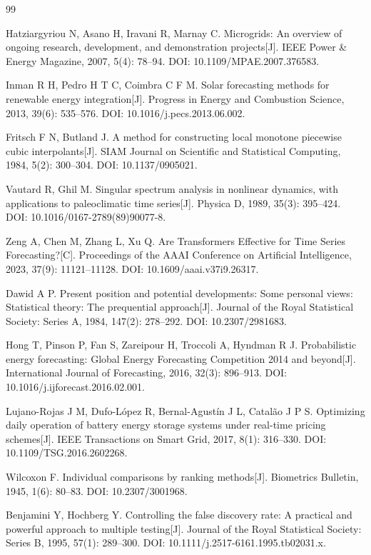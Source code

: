\begin{thebibliography}{99}

Hatziargyriou N, Asano H, Iravani R, Marnay C.
Microgrids: An overview of ongoing research, development, and demonstration projects[J].
IEEE Power \& Energy Magazine, 2007, 5(4): 78--94.
DOI: 10.1109/MPAE.2007.376583.

Inman R H, Pedro H T C, Coimbra C F M.
Solar forecasting methods for renewable energy integration[J].
Progress in Energy and Combustion Science, 2013, 39(6): 535--576.
DOI: 10.1016/j.pecs.2013.06.002.

Fritsch F N, Butland J.
A method for constructing local monotone piecewise cubic interpolants[J].
SIAM Journal on Scientific and Statistical Computing, 1984, 5(2): 300--304.
DOI: 10.1137/0905021.

Vautard R, Ghil M.
Singular spectrum analysis in nonlinear dynamics, with applications to paleoclimatic time series[J].
Physica D, 1989, 35(3): 395--424.
DOI: 10.1016/0167-2789(89)90077-8.

Zeng A, Chen M, Zhang L, Xu Q.
Are Transformers Effective for Time Series Forecasting?[C].
Proceedings of the AAAI Conference on Artificial Intelligence, 2023, 37(9): 11121--11128.
DOI: 10.1609/aaai.v37i9.26317.

Dawid A P.
Present position and potential developments: Some personal views: Statistical theory: The prequential approach[J].
Journal of the Royal Statistical Society: Series A, 1984, 147(2): 278--292.
DOI: 10.2307/2981683.

Hong T, Pinson P, Fan S, Zareipour H, Troccoli A, Hyndman R J.
Probabilistic energy forecasting: Global Energy Forecasting Competition 2014 and beyond[J].
International Journal of Forecasting, 2016, 32(3): 896--913.
DOI: 10.1016/j.ijforecast.2016.02.001.

Lujano-Rojas J M, Dufo-López R, Bernal-Agustín J L, Catalão J P S.
Optimizing daily operation of battery energy storage systems under real-time pricing schemes[J].
IEEE Transactions on Smart Grid, 2017, 8(1): 316--330.
DOI: 10.1109/TSG.2016.2602268.

Wilcoxon F.
Individual comparisons by ranking methods[J].
Biometrics Bulletin, 1945, 1(6): 80--83.
DOI: 10.2307/3001968.

Benjamini Y, Hochberg Y.
Controlling the false discovery rate: A practical and powerful approach to multiple testing[J].
Journal of the Royal Statistical Society: Series B, 1995, 57(1): 289--300.
DOI: 10.1111/j.2517-6161.1995.tb02031.x.


\end{thebibliography}
